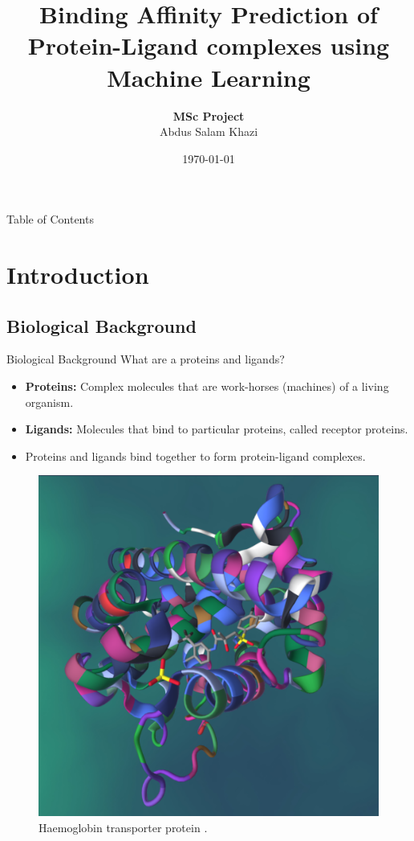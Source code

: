 \documentclass{beamer}
\title[Binding affinity prediction of PL complexes using ML]{Binding Affinity Prediction of Protein-Ligand complexes using Machine Learning}
\author[Abdus Salam Khazi]
{
    \textbf{MSc Project}\\
    Abdus Salam Khazi
}
\institute{Supervisors: \\
            \begin{tabular}{ll}
		    	Simon Bray \& Alireza Khanteymoori
		    \end{tabular}
}
\date{\today}
\begin{document}
\begin{frame}
\titlepage
\end{frame}

\begin{frame}{Table of Contents}
\tableofcontents
\end{frame}

\section{Introduction}

\subsection{Biological Background}

\begin{frame}[t]{Biological Background}
What are a proteins and ligands? 
\begin{itemize}
\item \textbf{Proteins:} Complex molecules that are work-horses (machines) of a living organism.
\item \textbf{Ligands:} Molecules that bind to particular proteins, called receptor proteins.

\item Proteins and ligands bind together to form protein-ligand complexes.

\end{itemize}

\begin{figure}[htb]
  \centering
    \includegraphics[scale=0.07]{images/pl_complex}
    \caption{Haemoglobin transporter protein \cite{PL_complex_introduction}.}
    \label{fig:HaemoglobinTransporterImage}
\end{figure}

\end{frame}
\end{document}
